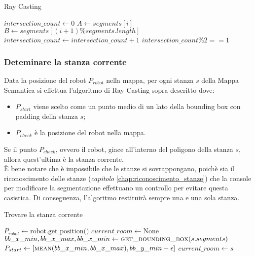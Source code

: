 \begin{algorithm}[h]
	\caption{Ray Casting}
	\begin{algorithmic}[1]
		\State $intersection\_count \gets 0$
		\State $A \gets segments[i]$
		\State $B \gets segments[(i+1) \% segments.length]$
		\State $intersection\_count \gets intersection\_count + 1$
		\EndIf
		\EndFor
		\State \Return $intersection\_count \% 2 == 1$
		\EndProcedure
	\end{algorithmic}
\end{algorithm}

\subsubsection{Deteminare la stanza corrente}

Data la posizione del robot $P_{robot}$ nella mappa, per ogni stanza $s$ della Mappa Semantica si effettua l'algoritmo di Ray Casting sopra descritto dove:
\begin{itemize}
	\item $P_{start}$ viene scelto come un punto medio di un lato della bounding box con padding della stanza $s$;
	\item $P_{check}$ è la posizione del robot nella mappa.
\end{itemize}
Se il punto $P_{check}$, ovvero il robot, giace all'interno del poligono della stanza $s$, allora quest'ultima è la stanza corrente. \\
È bene notare che è impossibile che le stanze si sovrappongano, poichè sia il riconoscimento delle stanze (\textit{capitolo} \ref{chap:riconoscimento_stanze}) che la console per modificare la segmentazione effettuano un controllo per evitare questa casistica. Di conseguenza, l'algoritmo restituirà sempre una e una sola stanza.

\begin{algorithm}
	\caption{Trovare la stanza corrente}
	\begin{algorithmic}[1]
		\State $P_{robot} \gets \text{robot.get\_position()}$
		\State $current\_room \gets \text{None}$
		\State $bb\_x\_min, bb\_x\_max, bb\_x\_min \gets \Call{get\_bounding\_box}{s.segments}$
		\State $P_{start} \gets \text{[} \Call{mean}{bb\_x\_min, bb\_x\_max}, bb\_y\_min - \epsilon \text{]}$
		\State $current\_room \gets s$
		\EndIf
		\EndFor
	\end{algorithmic}
\end{algorithm}

